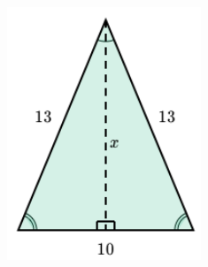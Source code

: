 \begin{solutionbox}{7cm}\footnotesize
    \begin{figure}
        \centering\captionsetup[subfigure]{justification=centering}
        \begin{subfigure}{0.45\linewidth}
            \includegraphics[width=\linewidth]{../images/area_isoseles_02a.png}
            \caption{}
            \label{subfig:area_isoseles_02a}
        \end{subfigure}
        \begin{subfigure}{0.45\linewidth}

\end{subfigure}
\end{figure}
\end{solutionbox}
